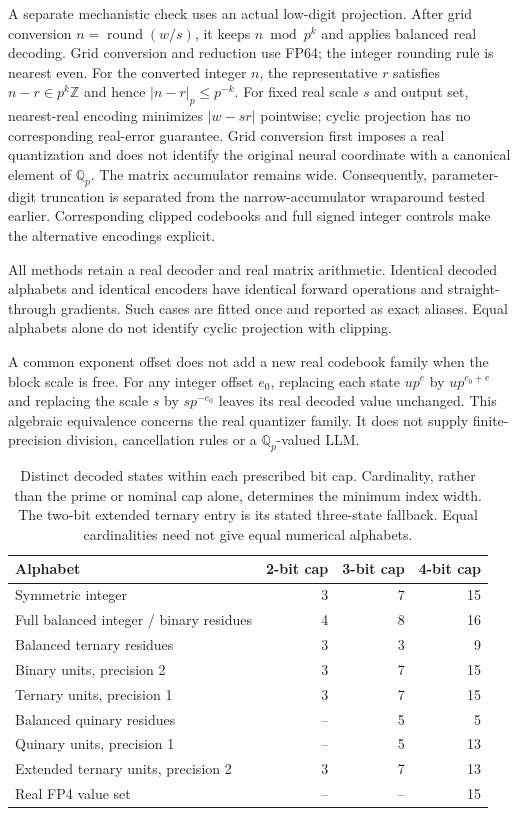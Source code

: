 \documentclass[11pt]{article}
\newcommand{\Z}{\mathbb{Z}}
\newcommand{\Qp}{\mathbb{Q}_p}
\begin{document}
A separate mechanistic check uses an actual low-digit projection.
After grid conversion \(n=\operatorname{round}(w/s)\), it keeps
\(n\bmod p^k\) and applies balanced real decoding. Grid conversion and
reduction use FP64; the integer rounding rule is nearest even.
For the converted integer $n$, the representative $r$ satisfies
$n-r\in p^k\Z$ and hence $|n-r|_p\leq p^{-k}$.
For fixed real scale $s$ and output set, nearest-real encoding minimizes
$|w-sr|$ pointwise; cyclic projection has no corresponding real-error
guarantee. Grid conversion first imposes a real quantization and does not
identify the original neural coordinate with a canonical element of $\Qp$.
The matrix accumulator remains wide. Consequently, parameter-digit
truncation is separated from the narrow-accumulator wraparound tested
earlier. Corresponding clipped codebooks and full signed integer controls
make the alternative encodings explicit.

All methods retain a real decoder and real matrix arithmetic. Identical
decoded alphabets and identical encoders have identical forward operations
and straight-through gradients. Such cases are fitted once and reported
as exact aliases. Equal alphabets alone do not identify cyclic projection
with clipping.


A common exponent offset does not add a new real codebook family when
the block scale is free. For any integer offset \(e_0\), replacing each
state \(up^e\) by \(up^{e_0+e}\) and replacing the scale \(s\) by
\(sp^{-e_0}\) leaves its real decoded value unchanged. This algebraic
equivalence concerns the real quantizer family. It does not supply
finite-precision division, cancellation rules or a \(\Qp\)-valued LLM.

\begin{table}[htbp]
\centering\small
\caption{Distinct decoded states within each prescribed bit cap. Cardinality,
rather than the prime or nominal cap alone, determines the minimum index
width. The two-bit extended ternary entry is its stated three-state fallback.
Equal cardinalities need not give equal numerical alphabets.}
\label{tab:low-precision-alphabets}
\begin{tabular}{lrrr}
\toprule
Alphabet & 2-bit cap & 3-bit cap & 4-bit cap\\
\midrule
Symmetric integer & 3 & 7 & 15\\
Full balanced integer / binary residues & 4 & 8 & 16\\
Balanced ternary residues & 3 & 3 & 9\\
Binary units, precision 2 & 3 & 7 & 15\\
Ternary units, precision 1 & 3 & 7 & 15\\
Balanced quinary residues & -- & 5 & 5\\
Quinary units, precision 1 & -- & 5 & 13\\
Extended ternary units, precision 2 & 3 & 7 & 13\\
Real FP4 value set & -- & -- & 15\\
\bottomrule
\end{tabular}
\end{table}
\end{document}

